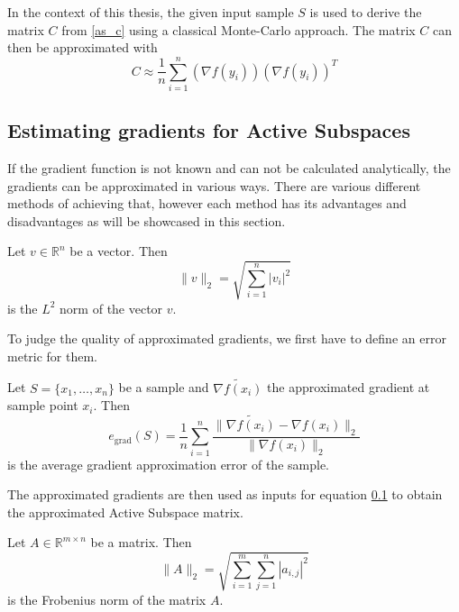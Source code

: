 \documentclass[
  a4paper,  %
  twoside,  %
  bibliography=totoc,
  headsepline,
  cleardoublepage=empty,
  parskip=half,
  draft=false
]{scrbook}
\begin{document}
In the context of this thesis, the given input sample $S$ is used to derive the matrix $C$ from \ref{as_c} using a classical Monte-Carlo approach.
The matrix $C$ can then be approximated with
\begin{equation}
C \approx \frac{1}{n} \sum_{i=1}^n  (\nabla f(y_i)) (\nabla f(y_i))^T
\nonumber
\end{equation}




\subsection{Estimating gradients for Active Subspaces}

If the gradient function is not known and can not be calculated analytically, the gradients can be approximated in various ways.
There are various different methods of achieving that, however each method has its advantages and disadvantages as will be showcased in this section.

\begin{definition}[$L^2$ norm]
Let $v \in \mathds{R}^{n}$ be a vector. Then
\begin{equation}
\| v\|_2=\sqrt{\sum_{i=1}^n |v_{i}|^2}
\nonumber
\end{equation}
is the $L^2$ norm of the vector $v$.
\end{definition}

To judge the quality of approximated gradients, we first have to define an error metric for them.

\begin{definition}
Let $S=\{x_1, \dots, x_n\}$ be a sample and $\widetilde{\nabla f(x_i)}$ the approximated gradient at sample point $x_i$. Then
\begin{equation}
e_{\text{grad}}(S)=\frac{1}{n} \sum_{i=1}^n \frac{\| \widetilde{\nabla f(x_i)} - \nabla f(x_i) \|_2}{\| \nabla f(x_i) \|_2}
\nonumber
\end{equation}
is the average gradient approximation error of the sample.
\end{definition}

The approximated gradients are then used as inputs for equation \ref{} to obtain the approximated Active Subspace matrix.

\begin{definition}
Let $A \in \mathds{R}^{m \times n}$ be a matrix. Then
\begin{equation}
\| A\|_2=\sqrt{\sum_{i=1}^m \sum_{j=1}^n |a_{i,j}|^2}
\nonumber
\end{equation}
is the Frobenius norm of the matrix $A$.
\end{definition}
\end{document}
